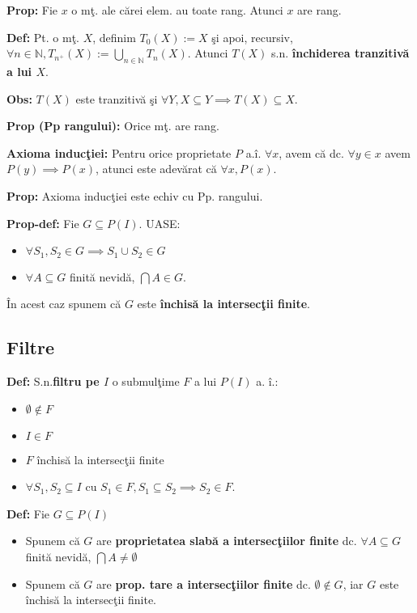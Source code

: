 \documentclass{article}
\begin{document}
\textbf{Prop:} Fie $x$ o m\c t. ale c\u arei elem. au toate rang. Atunci $x$ are rang.

\textbf{Def:} Pt. o m\c t. $X$, definim $T_0(X):=X$ \c si apoi, recursiv, $\forall n\in \mathbb N, T_{n^+}(X):=\bigcup_{n\in \mathbb N}T_n(X)$. Atunci $T(X)$ s.n. \textbf{\^ inchiderea tranzitiv\u a a lui $X$}.

\textbf{Obs:} $T(X)$ este tranzitiv\u a \c si $\forall Y, X\subseteq Y \implies T(X)\subseteq X$.

\textbf{Prop (Pp rangului):} Orice m\c t. are rang.

\textbf{Axioma induc\c tiei:} Pentru orice proprietate $P$ a.\^ i. $\forall x$, avem c\u a dc. $\forall y\in x$ avem $P(y) \implies P(x)$, atunci este adev\u arat c\u a $\forall x, P(x)$.

\textbf{Prop:} Axioma induc\c tiei este echiv cu Pp. rangului.

\textbf{Prop-def:} Fie $G\subseteq P(I).$ UASE:
\begin{itemize}
    \item $\forall S_1,S_2\in G \implies S_1\cup S_2\in G$
    \item $\forall A\subseteq G$ finit\u a nevid\u a, $\bigcap A\in G$.
\end{itemize}
\^ In acest caz spunem c\u a $G$ este \textbf{\^ inchis\u a la intersec\c tii finite}.

\subsection{Filtre}

\textbf{Def:} S.n.\textbf{filtru pe $I$} o submul\c time $F$ a lui $P(I)$ a. \^ i.:
\begin{itemize}
    \item $\emptyset\notin F$
    \item $I\in F$
    \item $F$ \^ inchis\u a la intersec\c tii finite
    \item $\forall S_1,S_2\subseteq I$ cu $S_1\in F, S_1\subseteq S_2 \implies S_2 \in F$.
\end{itemize}

\textbf{Def:} Fie $G\subseteq P(I)$
\begin{itemize}
    \item Spunem c\u a $G$ are \textbf{proprietatea slab\u a a intersec\c tiilor finite} dc. $\forall A\subseteq G$ finit\u a nevid\u a, $\bigcap A\neq \emptyset$
    \item Spunem c\u a $G$ are \textbf{prop. tare a intersec\c tiilor finite} dc. $\emptyset \notin G$, iar $G$ este \^ inchis\u a la intersec\c tii finite.
\end{itemize}
\end{document}
